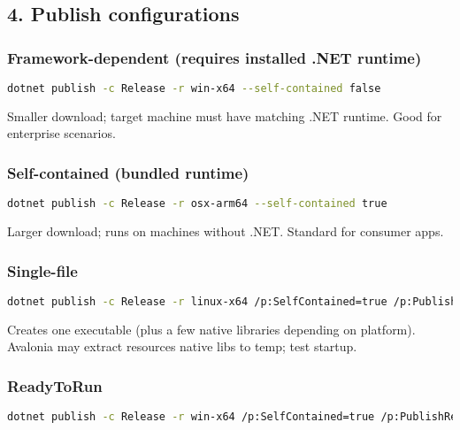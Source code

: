 \subsection{4. Publish configurations}\label{publish-configurations}

\subsubsection{Framework-dependent (requires installed .NET
runtime)}\label{framework-dependent-requires-installed-.net-runtime}

\begin{lstlisting}[language=bash]
dotnet publish -c Release -r win-x64 --self-contained false
\end{lstlisting}

Smaller download; target machine must have matching .NET runtime. Good
for enterprise scenarios.

\subsubsection{Self-contained (bundled
runtime)}\label{self-contained-bundled-runtime}

\begin{lstlisting}[language=bash]
dotnet publish -c Release -r osx-arm64 --self-contained true
\end{lstlisting}

Larger download; runs on machines without .NET. Standard for consumer
apps.

\subsubsection{Single-file}\label{single-file}

\begin{lstlisting}[language=bash]
dotnet publish -c Release -r linux-x64 /p:SelfContained=true /p:PublishSingleFile=true
\end{lstlisting}

Creates one executable (plus a few native libraries depending on
platform). Avalonia may extract resources native libs to temp; test
startup.

\subsubsection{ReadyToRun}\label{readytorun}

\begin{lstlisting}[language=bash]
dotnet publish -c Release -r win-x64 /p:SelfContained=true /p:PublishReadyToRun=true
\end{lstlisting}

